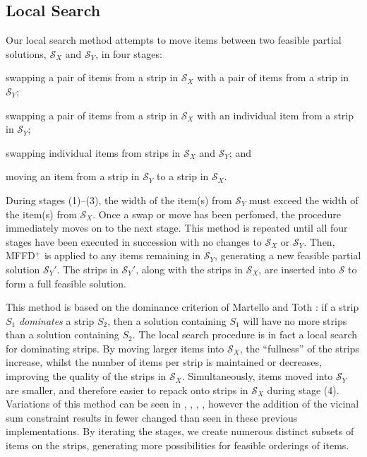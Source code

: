 \documentclass{elsarticle}
\begin{document}
\subsection{Local Search}
\label{sub:localsearch}
Our local search method attempts to move items between two feasible partial solutions, $\mathcal{S}_X$ and $\mathcal{S}_Y$, in four stages: \begin{enumerate*}[label={(\arabic*)}]
	\item swapping a pair of items from a strip in $\mathcal{S}_X$ with a pair of items from a strip in $\mathcal{S}_Y$;
	\item swapping a pair of items from a strip in $\mathcal{S}_X$ with an individual item from a strip in $\mathcal{S}_Y$;
	\item swapping individual items from strips in $\mathcal{S}_X$ and $\mathcal{S}_Y$; and
	\item moving an item from a strip in $\mathcal{S}_Y$ to a strip in $\mathcal{S}_X$.
\end{enumerate*} 
During stages (1)--(3), the width of the item(s) from $\mathcal{S}_Y$ must exceed the width of the item(s) from $\mathcal{S}_X$. Once a swap or move has been perfomed, the procedure immediately moves on to the next stage. This method is repeated until all four stages have been executed in succession with no changes to $\mathcal{S}_X$ or $\mathcal{S}_Y$. Then, MFFD$^+$ is applied to any items remaining in $\mathcal{S}_Y$, generating a new feasible partial solution $\mathcal{S}_Y'$. The strips in $\mathcal{S}_Y'$, along with the strips in $\mathcal{S}_X$, are inserted into $\mathcal{S}$ to form a full feasible solution.

This method is based on the dominance criterion of Martello and Toth \cite{martello1990l}: if a strip $S_1$ \emph{dominates} a strip $S_2$, then a solution containing $S_1$ will have no more strips than a solution containing $S_2$. The local search procedure is in fact a local search for dominating strips. By moving larger items into $\mathcal{S}_X$, the ``fullness'' of the strips increase, whilst the number of items per strip is maintained or decreases, improving the quality of the strips in $\mathcal{S}_X$. Simultaneously, items moved into $\mathcal{S}_Y$ are smaller, and therefore easier to repack onto strips in $\mathcal{S}_X$ during stage (4). Variations of this method can be seen in \cite{falkenauer1996}, \cite{levine2004}, \cite{lewis2009}, \cite{lewis2017}, however the addition of the vicinal sum constraint results in fewer changed than seen in these previous implementations. By iterating the stages, we create numerous distinct subsets of items on the strips, generating more possibilities for feasible orderings of items.
\end{document}
